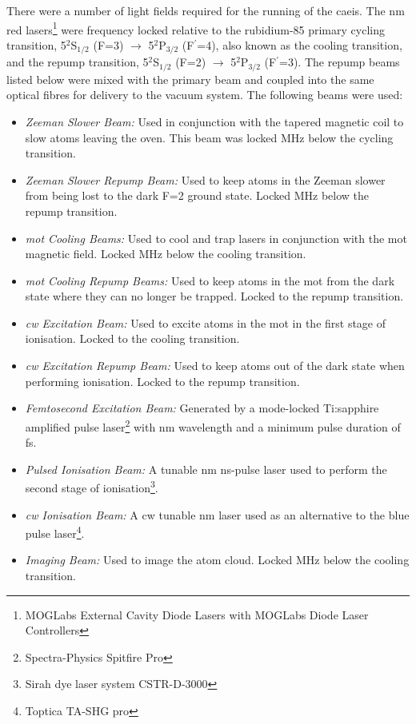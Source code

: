 There were a number of light fields required for the running of the \gls{caeis}.
The \unit[780]{nm} red lasers\footnote{MOGLabs External Cavity Diode Lasers with MOGLabs Diode Laser Controllers} were frequency locked relative to the rubidium-85 primary cycling transition, 5$^2$S$_{1/2}$ (F=3) $\rightarrow$ 5$^2$P$_{3/2}$ (F$^\prime$=4), also known as the cooling transition, and the repump transition, 5$^2$S$_{1/2}$ (F=2) $\rightarrow$ 5$^2$P$_{3/2}$ (F$^\prime$=3).
The repump beams listed below were mixed with the primary beam and coupled into the same optical fibres for delivery to the vacuum system.
The following beams were used:
\begin{itemize}
    \item{\emph{Zeeman Slower Beam:}} Used in conjunction with the tapered magnetic coil to slow atoms leaving the oven. This beam was locked \unit[250]{MHz} below the cycling transition.
    \item{\emph{Zeeman Slower Repump Beam:}} Used to keep atoms in the Zeeman slower from being lost to the dark F=2 ground state. Locked \unit[250]{MHz} below the repump transition.
    \item{\emph{\Gls{mot} Cooling Beams:}} Used to cool and trap lasers in conjunction with the \gls{mot} magnetic field. Locked \unit[10]{MHz} below the cooling transition.
    \item{\emph{\Gls{mot} Cooling Repump Beams:}} Used to keep atoms in the \gls{mot} from the dark state where they can no longer be trapped. Locked to the repump transition.
    \item{\emph{\Gls{cw} Excitation Beam:}} Used to excite atoms in the \gls{mot} in the first stage of ionisation. Locked to the cooling transition.
    \item{\emph{\Gls{cw} Excitation Repump Beam:}} Used to keep atoms out of the dark state when performing ionisation. Locked to the repump transition.
    \item{\emph{Femtosecond Excitation Beam:}} Generated by a mode-locked Ti:sapphire amplified pulse laser\footnote{Spectra-Physics Spitfire Pro} with \unit[780-830]{nm} wavelength and a minimum pulse duration of \unit[35]{fs}.
    \item{\emph{Pulsed Ionisation Beam:}} A tunable \unit[457-493]{nm} \unit[10]{ns}-pulse laser used to perform the second stage of ionisation\footnote{Sirah dye laser system CSTR-D-3000}.
    \item{\emph{\Gls{cw} Ionisation Beam:}} A \gls{cw} tunable \unit[480]{nm} laser used as an alternative to the blue pulse laser\footnote{Toptica TA-SHG pro}.
    \item{\emph{Imaging Beam:}} Used to image the atom cloud. Locked \unit[4]{MHz} below the cooling transition.
\end{itemize}

